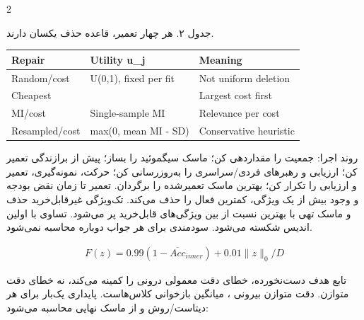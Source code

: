 \documentclass[10pt,a4paper]{article}
\begin{document}
\begin{multicols}{2}
\par\vspace{3pt}\begin{minipage}{\linewidth}{\footnotesize جدول ۲. هر چهار تعمیر، قاعده حذف یکسان دارند.\par}
\begin{latin}
{\fontsize{6.8}{8.3}\selectfont\setlength{\tabcolsep}{2pt}\renewcommand{\arraystretch}{1.1}
\begin{tabularx}{\linewidth}{>{\hsize=1.0000\hsize\raggedright\arraybackslash}X>{\hsize=1.0000\hsize\raggedright\arraybackslash}X>{\hsize=1.0000\hsize\raggedright\arraybackslash}X}\toprule
Repair & Utility u\_j & Meaning\\\midrule
Random/cost & U(0,1), fixed per fit & Not uniform deletion\\
Cheapest & 1 & Largest cost first\\
MI/cost & Single-sample MI & Relevance per cost\\
Resampled/cost & max(0, mean MI - SD) & Conservative heuristic\\
\bottomrule\end{tabularx}}
\end{latin}
\end{minipage}\par\vspace{3pt}
روند اجرا: جمعیت را مقداردهی کن؛ ماسک سیگموئید را بساز؛ پیش از برازندگی تعمیر کن؛ ارزیابی و رهبرهای فردی/سراسری را به‌روزرسانی کن؛ حرکت، نمونه‌گیری، تعمیر و ارزیابی را تکرار کن؛ بهترین ماسک تعمیرشده را برگردان. تعمیر تا زمان نقض بودجه و وجود بیش از یک ویژگی، کمترین  فعال را حذف می‌کند. تک‌ویژگی غیرقابل‌خرید حذف و ماسک تهی با بهترین نسبت از بین ویژگی‌های قابل‌خرید پر می‌شود. تساوی با اولین اندیس شکسته می‌شود. سودمندی برای هر جواب دوباره محاسبه نمی‌شود.

\begin{latin}\begin{equation}\begin{gathered}F(z)=0.99(1-\overline{Acc}_{inner})+0.01\|z\|_0/D\end{gathered}\end{equation}\end{latin}
تابع هدف دست‌نخورده، خطای دقت معمولی درونی را کمینه می‌کند، نه خطای دقت متوازن. دقت متوازن بیرونی ، میانگین بازخوانی کلاس‌هاست. پایداری یک‌بار برای هر دیتاست/روش و از  ماسک نهایی محاسبه می‌شود:


\end{multicols}
\end{document}
